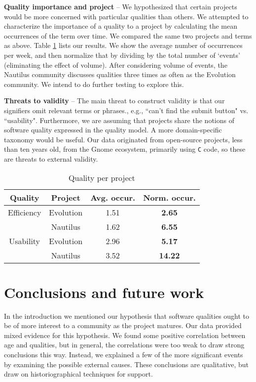 \documentclass[conference, compsoc]{IEEEtran}
\begin{document}
\noindent\textbf{Quality importance and project} -- We hypothesized that certain projects would be more concerned with particular qualities than others. We attempted to characterize the importance of a quality to a project by calculating the mean occurrences of the term over time. We compared the same two projects and terms as above. Table \ref{tbl:quality-project} lists our results. We show the average number of occurrences per week, and then normalize that by dividing by the total number of `events' (eliminating the effect of volume). After considering volume of events, the Nautilus community discusses qualities three times as often as the Evolution community. We intend to do further testing to explore this.

\noindent\textbf{Threats to validity} -- The main threat to construct validity is that our signifiers omit relevant terms or phrases., e.g., ``can't find the submit button" vs. ``usability". Furthermore, we are assuming that projects share the notions of software quality expressed in the quality model. A more domain-specific taxonomy would be useful. Our data originated from open-source projects, less than ten years old, from the Gnome ecosystem, primarily using \texttt{C} code, so these are threats to external validity.

\begin{table}[b]
	\caption{Quality per project}
	\centering
	\label{tbl:quality-project}
\begin{tabular}{|c|c|c|c|}
\hline
\rowcolor[gray]{.9} 
Quality & Project & Avg. occur. & Norm. occur.\\ \hline
Efficiency & Evolution & 1.51 & \textbf{2.65}\\
 & Nautilus & 1.62 &\textbf{ 6.55}\\\hline
Usability & Evolution & 2.96 & \textbf{5.17}\\
 & Nautilus & 3.52 & \textbf{14.22}\\
\hline
\end{tabular}
\end{table}

\vspace{-2mm}
\section{Conclusions and future work}
\vspace{-2mm}
In the introduction we mentioned our hypothesis that software qualities ought to be of more interest to a community as the project matures. Our data provided mixed evidence for this hypothesis. We found some positive correlation between age and qualities, but in general, the correlations were too weak to draw strong conclusions this way. Instead, we explained a few of the more significant events by examining the possible external causes. These conclusions are qualitative, but draw on historiographical techniques for support.
\end{document}
